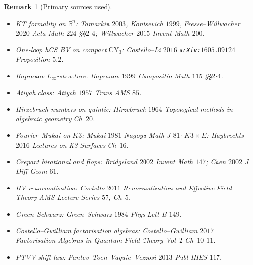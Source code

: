 \documentclass[11pt]{article}
\newtheorem{remark}[theorem]{Remark}
\providecommand{\CY}{\mathrm{CY}}
\providecommand{\RR}{\mathbb{R}}
\begin{document}
\begin{remark}[Primary sources used]
\label{rem:primary-sources}
\begin{itemize}
\item \emph{KT formality on $\RR^n$}: Tamarkin $2003$, Kontsevich
$1999$, Fresse--Willwacher $2020$ \emph{Acta Math} $224$ §§$2$-$4$;
Willwacher $2015$ \emph{Invent Math} $200$.
\item \emph{One-loop hCS BV on compact $\CY_3$}: Costello--Li
$2016$ \texttt{arXiv:$1605$.$09124$} Proposition $5.2$.
\item \emph{Kapranov $L_\infty$-structure}: Kapranov $1999$
\emph{Compositio Math} $115$ §§$2$-$4$.
\item \emph{Atiyah class}: Atiyah $1957$ \emph{Trans AMS} $85$.
\item \emph{Hirzebruch numbers on quintic}: Hirzebruch $1964$
\emph{Topological methods in algebraic geometry} Ch~$20$.
\item \emph{Fourier--Mukai on $K3$}: Mukai $1981$ \emph{Nagoya
Math J} $81$;  $K3 \times E$: Huybrechts $2016$ \emph{Lectures on
K3 Surfaces} Ch~$16$.
\item \emph{Crepant birational and flops}: Bridgeland $2002$
\emph{Invent Math} $147$; Chen $2002$ \emph{J Diff Geom} $61$.
\item \emph{BV renormalisation}: Costello $2011$ \emph{Renormalization
and Effective Field Theory} AMS Lecture Series $57$, Ch~$5$.
\item \emph{Green--Schwarz}: Green--Schwarz $1984$ \emph{Phys Lett
B} $149$.
\item \emph{Costello--Gwilliam factorisation algebras}:
Costello--Gwilliam $2017$ \emph{Factorisation Algebras in
Quantum Field Theory} Vol~$2$ Ch~$10$-$11$.
\item \emph{PTVV shift law}: Pantev--Toen--Vaquie--Vezzosi $2013$
\emph{Publ IHES} $117$.
\end{itemize}
\end{remark}
\end{document}

